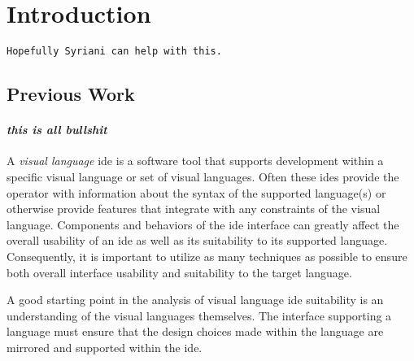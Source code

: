\section{Introduction}
\label{sec:introduction}

\begin{verbatim}
Hopefully Syriani can help with this.
\end{verbatim}





\subsection{Previous Work}
\label{subsec:previous_work}

\paragraph{\textit{this is all bullshit}} A \textit{visual language}
\ac{ide} is a software tool that supports development within a specific
visual language or set of visual languages. Often these \acp{ide} provide
the operator with information about the syntax of the supported language(s)
or otherwise provide features that integrate with any constraints of the
visual language. Components and behaviors of the \ac{ide} interface can
greatly affect the overall usability of an \ac{ide} as well as its
suitability to its supported language. Consequently, it is important to
utilize as many techniques as possible to ensure both overall interface
usability and suitability to the target language.

A good starting point in the analysis of visual language \ac{ide}
suitability is an understanding of the visual languages themselves. The
interface supporting a language must ensure that the design choices made
within the language are mirrored and supported within the \ac{ide}.
\cite{hils1992}
